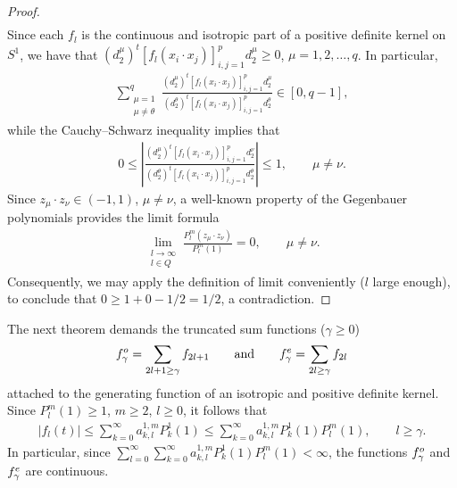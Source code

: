 \documentclass[11pt]{article}
\numberwithin{equation}{section}
\begin{document}
\begin{proof}
\begin{gather*}
\end{gather*}
Since each $f_l$ is the continuous and isotropic part of a positive def\/inite kernel on $S^1$, we have that $(d_2^\mu)^t [f_l(x_i \cdot x_j)]_{i,j=1}^p d_2^\mu\geq 0$, $\mu=1,2,\ldots, q$. In particular,
\begin{gather*}
\sum_{\substack{\mu=1 \\ \mu \neq \theta}}^q \frac{(d_2^\mu)^t [f_l(x_i \cdot x_j)]_{i,j=1}^p d_2^\mu}{(d_2^\theta)^t [f_l(x_i \cdot x_j)]_{i,j=1}^p d_2^\theta} \in [0,q-1],
\end{gather*}
while the Cauchy--Schwarz inequality implies that
\begin{gather*}
0\leq \left|\frac{(d_2^\mu)^t [f_l(x_i \cdot x_j)]_{i,j=1}^p d_2^\nu}{(d_2^\theta)^t [f_l(x_i \cdot x_j)]_{i,j=1}^p d_2^\theta}\right|\leq 1, \qquad \mu \neq \nu.
\end{gather*}
Since $z_\mu \cdot z_\nu \in (-1,1)$, $\mu \neq \nu$, a well-known property of the Gegenbauer polynomials provides the limit formula~\cite[p.~196]{szego}
\begin{gather*}\lim_{\substack{l\to \infty \\ l\in Q}} \frac{P_l^m(z_\mu\cdot z_\nu)}{P_l^m(1)}=0, \qquad \mu \neq \nu.\end{gather*}
Consequently, we may apply the def\/inition of limit conveniently ($l$ large enough), to conclude that $0\geq 1+0-1/2=1/2$, a contradiction.
\end{proof}

The next theorem demands the truncated sum functions ($\gamma\geq 0$)
\begin{gather*}f_\gamma^{\rm o}=\sum_{2l+1\geq \gamma} f_{2l+1} \qquad \mbox{and} \qquad f_\gamma^{\rm e}= \sum_{2l \geq \gamma} f_{2l}\end{gather*}
attached to the generating function of an isotropic and positive def\/inite kernel. Since $P_l^m(1)\geq 1$, $m\geq 2$, $l\geq 0$, it follows that
\begin{gather*}
|f_l(t)| \leq \sum_{k=0}^\infty a_{k,l}^{1,m}P_k^1(1)\leq \sum_{k=0}^\infty a_{k,l}^{1,m}P_k^1(1)P_l^m(1),\qquad l\geq \gamma.
\end{gather*}
In particular, since $\sum\limits_{l=0}^\infty \sum\limits_{k=0}^\infty a_{k,l}^{1,m}P_k^1(1)P_l^m(1) <\infty$, the functions $f_\gamma^{\rm o}$ and $f_\gamma^{\rm e}$ are continuous.
\end{document}
